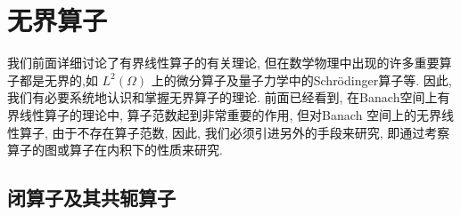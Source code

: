 \documentclass[lang=cn,newtx,10pt,scheme=chinese,thmcnt=chapter]{elegantbook}
\begin{document}
\chapter{无界算子}

我们前面详细讨论了有界线性算子的有关理论, 但在数学物理中出现的许多重要算子都是无界的,如 \({L}^{2}\left( \Omega \right)\) 上的微分算子及量子力学中的Schrödinger算子等. 因此, 我们有必要系统地认识和掌握无界算子的理论. 前面已经看到, 在Banach空间上有界线性算子的理论中, 算子范数起到非常重要的作用, 但对Banach 空间上的无界线性算子, 由于不存在算子范数, 因此, 我们必须引进另外的手段来研究, 即通过考察算子的图或算子在内积下的性质来研究.

\section{闭算子及其共轭算子}
\end{document}
